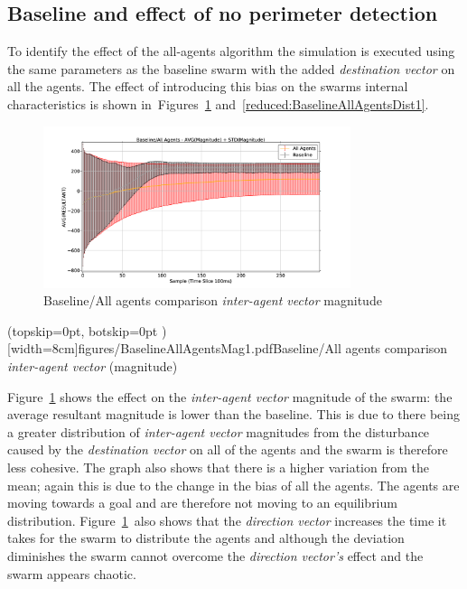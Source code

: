 \documentclass{ieeeaccess}
\begin{document}
\subsection{Baseline and effect of no perimeter detection\label{section:compareBaselineNoPerimeter}}
To identify the effect of the all-agents algorithm the simulation is executed using the same parameters as the baseline swarm with the added \textit{destination vector} on all the agents. The effect of introducing this bias on the swarms internal characteristics is shown in~Figures~\ref{reduced:BaselineAllAgentsMag1} and~\ref{reduced:BaselineAllAgentsDist1}.
\begin{figure}
\begin{center}
\includegraphics[width=9cm]{figures/BaselineAllAgentsMag1.pdf}
\end{center}
\caption{Baseline/All agents comparison \textit{inter-agent vector} magnitude\label{reduced:BaselineAllAgentsMag1}}
\end{figure}

\Figure[t!](topskip=0pt, botskip=0pt )[width=8cm]{figures/BaselineAllAgentsMag1.pdf}{Baseline/All agents comparison \textit{inter-agent vector} (magnitude)\label{reduced:BaselineAllAgentsMag1}}

Figure~\ref{reduced:BaselineAllAgentsMag1} shows the effect on the \textit{inter-agent vector} magnitude of the swarm: the average resultant magnitude is lower than the baseline. This is due to there being a greater distribution of \textit{inter-agent vector} magnitudes from the disturbance caused by the \textit{destination vector} on all of the agents and the swarm is therefore less cohesive. The graph also shows that there is a higher variation from the mean; again this is due to the change in the bias of all the agents. The agents are moving towards a goal and are therefore not moving to an equilibrium distribution. Figure~\ref{reduced:BaselineAllAgentsMag1}~also shows that the \textit{direction vector} increases the time it takes for the swarm to distribute the agents and although the deviation diminishes the swarm cannot overcome the \textit{direction vector's} effect and the swarm appears chaotic.
\end{document}
